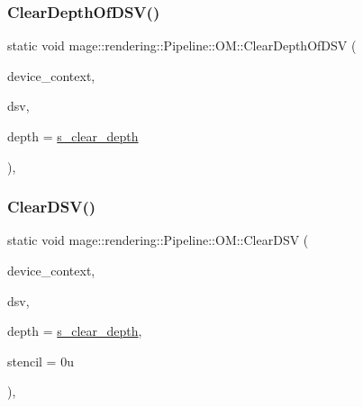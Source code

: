 \subsubsection{\texorpdfstring{Clear\+Depth\+Of\+D\+S\+V()}{ClearDepthOfDSV()}}
{\footnotesize\ttfamily static void mage\+::rendering\+::\+Pipeline\+::\+O\+M\+::\+Clear\+Depth\+Of\+D\+SV (\begin{DoxyParamCaption}\item[{I\+D3\+D11\+Device\+Context \&}]{device\+\_\+context,  }\item[{I\+D3\+D11\+Depth\+Stencil\+View $\ast$}]{dsv,  }\item[{\mbox{\hyperlink{namespacemage_aa97e833b45f06d60a0a9c4fc22ae02c0}{F32}}}]{depth = {\ttfamily \mbox{\hyperlink{structmage_1_1rendering_1_1_pipeline_1_1_o_m_a9eb4fec4852a3ca2e588a90818a706ec}{s\+\_\+clear\+\_\+depth}}} }\end{DoxyParamCaption})\hspace{0.3cm}{\ttfamily [static]}, {\ttfamily [noexcept]}}

\mbox{\label{structmage_1_1rendering_1_1_pipeline_1_1_o_m_ac25264c6f064940f886e86ec9d5fedd4}} 
\subsubsection{\texorpdfstring{Clear\+D\+S\+V()}{ClearDSV()}}
{\footnotesize\ttfamily static void mage\+::rendering\+::\+Pipeline\+::\+O\+M\+::\+Clear\+D\+SV (\begin{DoxyParamCaption}\item[{I\+D3\+D11\+Device\+Context \&}]{device\+\_\+context,  }\item[{I\+D3\+D11\+Depth\+Stencil\+View $\ast$}]{dsv,  }\item[{\mbox{\hyperlink{namespacemage_aa97e833b45f06d60a0a9c4fc22ae02c0}{F32}}}]{depth = {\ttfamily \mbox{\hyperlink{structmage_1_1rendering_1_1_pipeline_1_1_o_m_a9eb4fec4852a3ca2e588a90818a706ec}{s\+\_\+clear\+\_\+depth}}},  }\item[{\mbox{\hyperlink{namespacemage_afc638980bc6154f15af5e2d93a0e0ea9}{U8}}}]{stencil = {\ttfamily 0u} }\end{DoxyParamCaption})\hspace{0.3cm}{\ttfamily [static]}, {\ttfamily [noexcept]}}

